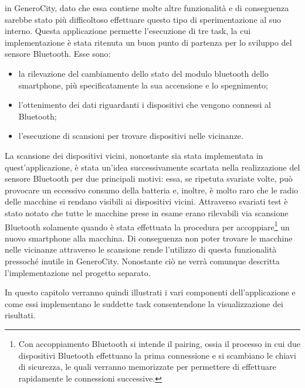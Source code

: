 in GeneroCity, dato che essa contiene molte altre funzionalità e di conseguenza sarebbe stato più difficoltoso effettuare questo tipo di sperimentazione al suo interno. Questa applicazione permette l'esecuzione di tre task, la cui implementazione è stata ritenuta un buon punto di partenza per lo sviluppo del sensore Bluetooth. Esse sono:
\begin{itemize}
    \item la rilevazione del cambiamento dello stato del modulo bluetooth dello smartphone, più specificatamente la sua accensione e lo spegnimento;
    \item l'ottenimento dei dati riguardanti i dispositivi che vengono connessi al Bluetooth;
    \item l'esecuzione di scansioni per trovare dispositivi nelle vicinanze.
\end{itemize}
La scansione dei dispositivi vicini, nonostante sia stata implementata in quest'applicazione, è stata un'idea successivamente scartata nella realizzazione del sensore Bluetooth per due principali motivi: essa, se ripetuta svariate volte, può provocare un eccessivo consumo della batteria e, inoltre, è molto raro che le radio delle macchine si rendano visibili ai dispositivi vicini. Attraverso svariati test è stato notato che tutte le macchine prese in esame erano rilevabili via scansione Bluetooth solamente quando è stata effettuata la procedura per accoppiare\footnote{Con accoppiamento Bluetooth si intende il pairing, ossia il processo in cui due dispositivi Bluetooth effettuano la prima connessione e si scambiano le chiavi di sicurezza, le quali verranno memorizzate per permettere di effettuare rapidamente le connessioni successive.} un nuovo smartphone alla macchina. Di conseguenza non poter trovare le macchine nelle vicinanze attraverso le scansione rende l'utilizzo di questa funzionalità pressoché inutile in GeneroCity. Nonostante ciò ne verrà comunque descritta l'implementazione nel progetto separato.

In questo capitolo verranno quindi illustrati i vari componenti dell'applicazione e come essi implementano le suddette task consentendone la visualizzazione dei risultati. 

